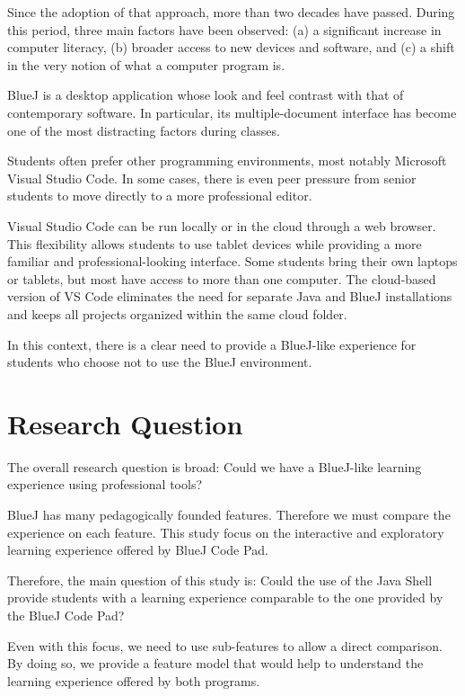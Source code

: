 \documentclass{article}
\begin{document}
Since the adoption of that approach, more than two decades have passed. During this period, three main factors have been observed: (a) a significant increase in computer literacy, (b) broader access to new devices and software, and (c) a shift in the very notion of what a computer program is.

BlueJ is a desktop application whose look and feel contrast with that of contemporary software. In particular, its multiple-document interface has become one of the most distracting factors during classes.

Students often prefer other programming environments, most notably Microsoft Visual Studio Code. In some cases, there is even peer pressure from senior students to move directly to a more professional editor.


Visual Studio Code can be run locally or in the cloud through a web browser. This flexibility allows students to use tablet devices while providing a more familiar and professional-looking interface. Some students bring their own laptops or tablets, but most have access to more than one computer. The cloud-based version of VS Code eliminates the need for separate Java and BlueJ installations and keeps all projects organized within the same cloud folder.

In this context, there is a clear need to provide a BlueJ-like experience for students who choose not to use the BlueJ environment.

\section{Research Question}

The overall research question is broad: Could we have a BlueJ-like learning experience using professional tools?

BlueJ has many pedagogically founded features. Therefore we must compare the experience on each feature. This study focus on the interactive and exploratory learning experience offered by BlueJ Code Pad.

Therefore, the main question of this study is:
Could the use of the Java Shell provide students with a learning experience comparable to the one provided by the BlueJ Code Pad?

Even with this focus, we need to use sub-features to allow a direct comparison. By doing so, we provide a feature model that would help to understand the learning experience offered by both programs.
\end{document}
